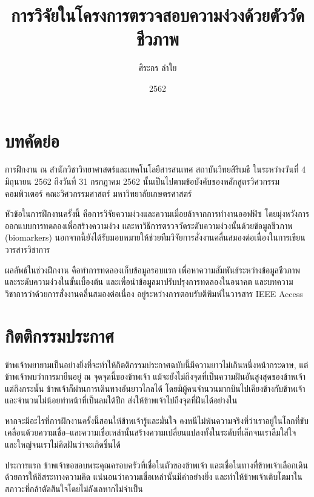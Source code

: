 \documentclass[16pt,a4]{internshipreport}
\title{การวิจัยในโครงการตรวจสอบความง่วงด้วยตัววัดชีวภาพ}
\date{2562}
\author{ศิระกร ลำใย}
\begin{document}
\maketitle

\chapter*{บทคัดย่อ}

การฝึกงาน ณ สำนักวิชาวิทยาศาสตร์และเทคโนโลยีสารสนเทศ สถาบันวิทยสิริเมธี ในระหว่างวันที่ 4 มิถุนายน 2562 ถึงวันที่ 31 กรกฎาคม 2562 นั้นเป็นไปตามข้อบังคับของหลักสูตรวิศวกรรมคอมพิวเตอร์ คณะวิศวกรรมศาสตร์ มหาวิทยาลัยเกษตรศาสตร์

หัวข้อในการฝึกงานครั้งนี้ คือการวิจัยความง่วงและความเมื่อยล้าจากการทำงานออฟฟิซ โดยมุ่งหวังการออกแบบการทดลองเพื่อสร้างความง่วง และหาวิธีการตรวจวัดระดับความง่วงนั้นด้วยข้อมูลชีวภาพ (biomarkers) นอกจากนี้ยังได้รับมอบหมายให้ช่วยทีมวิจัยการสั่งงานคลื่นสมองต่อเนื่องในการเขียนวารสารวิชาการ

ผลลัพธ์ในช่วงฝึกงาน คือทำการทดลองเก็บข้อมูลรอบแรก เพื่อหาความสัมพันธ์ระหว่างข้อมูลชีวภาพและระดับความง่วงในขั้นเบื้องต้น และเพื่อนำข้อมูลมาปรับปรุงการทดลองในอนาคต และบทความวิชาการว่าด้วยการสั่งงานคลื่นสมองต่อเนื่อง อยู่ระหว่างการตอบรับตีพิมพ์ในวารสาร IEEE Access

\chapter*{กิตติกรรมประกาศ}

ข้าพเจ้าพยายามเป็นอย่างยิ่งที่จะทำให้กิตติกรรมประกาศฉบับนี้มีความยาวไม่เกินหนึ่งหน้ากระดาษ, แต่ข้าพเจ้าพบว่าการมายืนอยู่ ณ จุดจุดนี้ของข้าพเจ้า แม้จะยังไม่ถึงจุดที่เป็นความฝันอันสูงสุดของข้าพเจ้า แต่ถึงกระนั้น ข้าพเจ้าก็ผ่านการเดินทางอันยาวไกลได้ โดยมีผู้คนจำนวนมากบินไปเคียงข้างกับข้าพเจ้า และจำนวนไม่น้อยทำหน้าที่เป็นลมใต้ปีก ส่งให้ข้าพเจ้าไปถึงจุดที่ฝันได้อย่างใน

หากจะมีอะไรที่การฝึกงานครั้งนี้สอนให้ข้าพเจ้ารู้และมั่นใจ คงหนีไม่พ้นความจริงที่ว่าเราอยู่ในโลกที่ขับเคลื่อนด้วยความเชื่อ--และความเชื่อเหล่านั้นสร้างความเปลี่ยนแปลงทั้งในระดับที่เล็กจนเราลืมใส่ใจ และใหญ่จนเราไม่คิดฝันว่าจะเกิดขึ้นได้

ประการแรก ข้าพเจ้าขอขอบพระคุณครอบครัวที่เชื่อในตัวของข้าพเจ้า และเชื่อในทางที่ข้าพเจ้าเลือกเดิน ด้วยการให้อิสระทางความคิด แน่นอนว่าความเชื่อเหล่านั้นมีค่าอย่างยิ่ง และทำให้ข้าพเจ้าเติบโตมาในสภาวะที่กล้าตัดสินใจโดยไม่ลังเลหากไม่จำเป็น
\end{document}
